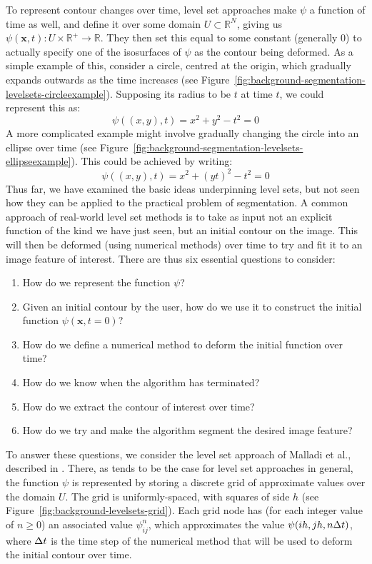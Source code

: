 To represent contour changes over time, level set approaches make $\psi$ a function of time as well, and define it over some domain $U \subset \mathbb{R}^N$, giving us $\psi(\mathbf{x}, t) : U \times \mathbb{R}^+ \rightarrow \mathbb{R}$. They then set this equal to some constant (generally $0$) to actually specify one of the isosurfaces of $\psi$ as the contour being deformed. As a simple example of this, consider a circle, centred at the origin, which gradually expands outwards as the time increases (see Figure~\ref{fig:background-segmentation-levelsets-circleexample}). Supposing its radius to be $t$ at time $t$, we could represent this as:
%
\[
\psi((x,y),t) = x^2 + y^2 - t^2 = 0
\]
%
A more complicated example might involve gradually changing the circle into an ellipse over time (see Figure~\ref{fig:background-segmentation-levelsets-ellipseexample}). This could be achieved by writing:
%
\[
\psi((x,y),t) = x^2 + (yt)^2 - t^2 = 0
\]
%
Thus far, we have examined the basic ideas underpinning level sets, but not seen how they can be applied to the practical problem of segmentation. A common approach of real-world level set methods is to take as input not an explicit function of the kind we have just seen, but an initial contour on the image. This will then be deformed (using numerical methods) over time to try and fit it to an image feature of interest. There are thus six essential questions to consider:

\begin{enumerate}

\item How do we represent the function $\psi$?

\item Given an initial contour by the user, how do we use it to construct the initial function $\psi(\mathbf{x}, t = 0)$?

\item How do we define a numerical method to deform the initial function over time?

\item How do we know when the algorithm has terminated?

\item How do we extract the contour of interest over time?

\item How do we try and make the algorithm segment the desired image feature?

\end{enumerate}

\noindent To answer these questions, we consider the level set approach of Malladi et al., described in \cite{malladi95}. There, as tends to be the case for level set approaches in general, the function $\psi$ is represented by storing a discrete grid of approximate values over the domain $U$. The grid is uniformly-spaced, with squares of side $h$ (see Figure~\ref{fig:background-levelsets-grid}). Each grid node has (for each integer value of $n \ge 0$) an associated value $\psi_{ij}^n$, which approximates the value $\psi(ih,jh,n\Delta t)$, where $\Delta t$ is the time step of the numerical method that will be used to deform the initial contour over time.

